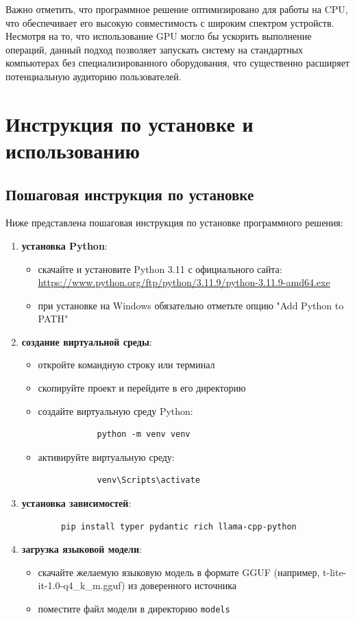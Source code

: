 Важно отметить, что программное решение оптимизировано для работы на CPU, что обеспечивает его высокую совместимость с широким спектром устройств. Несмотря на то, что использование GPU могло бы ускорить выполнение операций, данный подход позволяет запускать систему на стандартных компьютерах без специализированного оборудования, что существенно расширяет потенциальную аудиторию пользователей.

\section{Инструкция по установке и использованию}

\subsection{Пошаговая инструкция по установке}

Ниже представлена пошаговая инструкция по установке программного решения:

\begin{enumerate}
	\item \textbf{установка Python}:
	\begin{itemize}
		\item скачайте и установите Python 3.11 с официального сайта: \url{https://www.python.org/ftp/python/3.11.9/python-3.11.9-amd64.exe}
		\item при установке на Windows обязательно отметьте опцию "Add Python to PATH"
	\end{itemize}

	\item \textbf{создание виртуальной среды}:
	\begin{itemize}
		\item откройте командную строку или терминал
		\item скопируйте проект и перейдите в его директорию
		\item создайте виртуальную среду Python:
		\begin{verbatim}
			python -m venv venv
		\end{verbatim}
		\item активируйте виртуальную среду:
		\begin{verbatim}
			venv\Scripts\activate
		\end{verbatim}
	\end{itemize}

	\item \textbf{установка зависимостей}:
	\begin{verbatim}
		pip install typer pydantic rich llama-cpp-python
	\end{verbatim}

	\item \textbf{загрузка языковой модели}:
	\begin{itemize}
		\item скачайте желаемую языковую модель в формате GGUF (например, t-lite-it-1.0-q4\_k\_m.gguf) из доверенного источника
		\item поместите файл модели в директорию \texttt{models}
	\end{itemize}
\end{enumerate}


